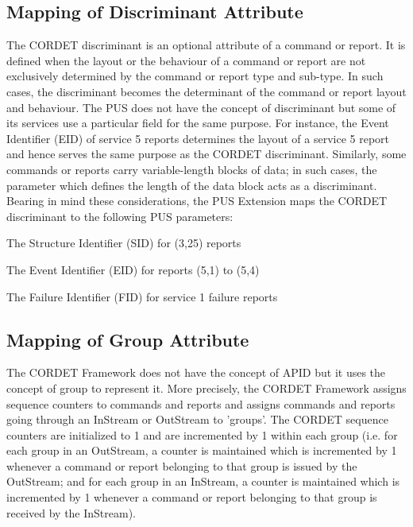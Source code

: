 \documentclass[a4paper,10pt]{article}
\newenvironment{fw_itemize}						%
{\begin{itemize}
  \setlength{\itemsep}{1mm}
  \setlength{\parskip}{0pt}
  \setlength{\parsep}{0pt}}
{\end{itemize}}
\begin{document}
\subsection{Mapping of Discriminant Attribute}\label{sec:mapDisc}
The CORDET discriminant is an optional attribute of a command or report. It is defined when the layout or the behaviour of a command or report are not exclusively determined by the command or report type and sub-type. In such cases, the discriminant becomes the determinant of the command or report layout and behaviour. The PUS does not have the concept of discriminant but some of its services use a particular field for the same purpose. For instance, the Event Identifier (EID) of service 5 reports determines the layout of a service 5 report and hence serves the same purpose as the CORDET discriminant. Similarly, some commands or reports carry variable-length blocks of data; in such cases, the parameter which defines the length of the data block acts as a discriminant. Bearing in mind these considerations, the PUS Extension maps the CORDET discriminant to the following PUS parameters:

\begin{fw_itemize}
\item The Structure Identifier (SID) for (3,25) reports
\item The Event Identifier (EID) for reports (5,1) to (5,4)
\item The Failure Identifier (FID) for service 1 failure reports
\end{fw_itemize}

\subsection{Mapping of Group Attribute}\label{sec:mapGroup}
The CORDET Framework does not have the concept of APID but it uses the concept of group to represent it. More precisely, the CORDET Framework assigns sequence counters to commands and reports and assigns commands and reports going through an InStream or OutStream to 'groups'. The CORDET sequence counters are initialized to 1 and are incremented by 1 within each group (i.e. for each group in an OutStream, a counter is maintained which is incremented by 1 whenever a command or report belonging to that group is issued by the OutStream; and for each group in an InStream, a counter is maintained which is incremented by 1 whenever a command or report belonging to that group is received by the InStream). 
\end{document}
